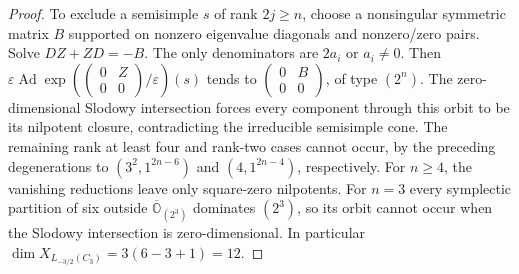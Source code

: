 \documentclass[11pt,a4paper]{amsart}
\numberwithin{equation}{section}
\theoremstyle{definition}
\theoremstyle{remark}
\newcommand{\clO}[1]{\overline{\mathbb O}_{(#1)}}
\begin{document}
\begin{proof}
To exclude a semisimple $s$ of rank $2j\ge n$, choose a nonsingular
symmetric matrix $B$ supported on nonzero eigenvalue diagonals and
nonzero/zero pairs. Solve $DZ+ZD=-B$. The only denominators are
$2a_i$ or $a_i\ne0$. Then
$\varepsilon\operatorname{Ad}\exp(\left(\begin{smallmatrix}0&Z\\0&0\end{smallmatrix}\right)/\varepsilon)(s)$
tends to $\left(\begin{smallmatrix}0&B\\0&0\end{smallmatrix}\right)$,
of type $(2^n)$. The zero-dimensional Slodowy intersection forces every component
through this orbit to be its nilpotent closure, contradicting the
irreducible semisimple cone. The remaining rank at least four and
rank-two cases cannot occur, by the preceding degenerations to
$(3^2,1^{2n-6})$ and $(4,1^{2n-4})$, respectively.
For $n\ge4$, the vanishing reductions leave only square-zero nilpotents.
For $n=3$ every symplectic partition of six outside $\clO{2^3}$
dominates $(2^3)$, so its orbit cannot occur when the Slodowy intersection is zero-dimensional.
In particular $\dim X_{L_{-3/2}(C_3)}=3(6-3+1)=12$.
\end{proof}
\end{document}
